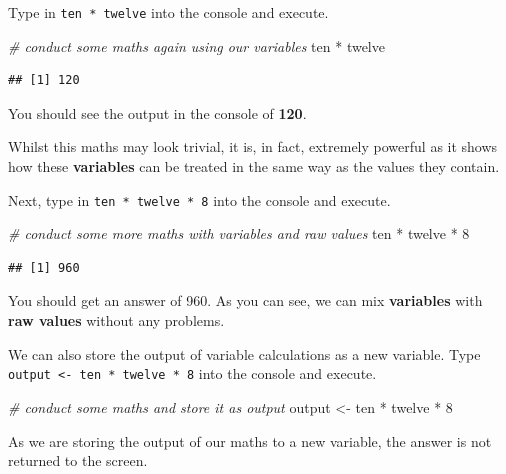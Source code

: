 \documentclass[
]{book}
\newenvironment{Shaded}{\begin{snugshade}}{\end{snugshade}}
\newcommand{\CommentTok}[1]{\textcolor[rgb]{0.56,0.35,0.01}{\textit{#1}}}
\newcommand{\DecValTok}[1]{\textcolor[rgb]{0.00,0.00,0.81}{#1}}
\newcommand{\NormalTok}[1]{#1}
\newcommand{\OtherTok}[1]{\textcolor[rgb]{0.56,0.35,0.01}{#1}}
\newcommand{\SpecialCharTok}[1]{\textcolor[rgb]{0.00,0.00,0.00}{#1}}
\begin{document}
Type in \texttt{ten\ *\ twelve} into the console and execute.

\begin{Shaded}
\begin{Highlighting}[]
\CommentTok{\# conduct some maths again using our variables}
\NormalTok{ten }\SpecialCharTok{*}\NormalTok{ twelve}
\end{Highlighting}
\end{Shaded}

\begin{verbatim}
## [1] 120
\end{verbatim}

You should see the output in the console of \textbf{120}.

Whilst this maths may look trivial, it is, in fact, extremely powerful as it shows how these \textbf{variables} can be treated in the same way as the values they contain.

Next, type in \texttt{ten\ *\ twelve\ *\ 8} into the console and execute.

\begin{Shaded}
\begin{Highlighting}[]
\CommentTok{\# conduct some more maths with variables and raw values}
\NormalTok{ten }\SpecialCharTok{*}\NormalTok{ twelve }\SpecialCharTok{*} \DecValTok{8}
\end{Highlighting}
\end{Shaded}

\begin{verbatim}
## [1] 960
\end{verbatim}

You should get an answer of 960. As you can see, we can mix \textbf{variables} with \textbf{raw values} without any problems.

We can also store the output of variable calculations as a new variable. Type \texttt{output\ \textless{}-\ ten\ *\ twelve\ *\ 8} into the console and execute.

\begin{Shaded}
\begin{Highlighting}[]
\CommentTok{\# conduct some maths and store it as output}
\NormalTok{output }\OtherTok{\textless{}{-}}\NormalTok{ ten }\SpecialCharTok{*}\NormalTok{ twelve }\SpecialCharTok{*} \DecValTok{8}
\end{Highlighting}
\end{Shaded}

As we are storing the output of our maths to a new variable, the answer is not returned to the screen.
\end{document}
